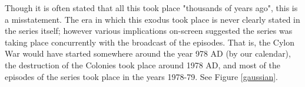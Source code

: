 Though it is often stated that all this took place "thousands of years ago", this is a misstatement. The era in which this exodus took place is never clearly stated in the series itself; however various implications on-screen suggested the series was taking place concurrently with the broadcast of the episodes. That is, the Cylon War would have started somewhere around the year 978 AD (by our calendar), the destruction of the Colonies took place around 1978 AD, and most of the episodes of the series took place in the years 1978-79. See Figure \ref{gaussian}.


